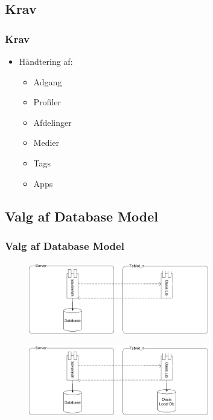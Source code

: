 \documentclass{beamer}
\begin{document}
\subsection{Krav}

\begin{frame}
	\frametitle{Krav}
	
	\begin{itemize}
		\item H\aa{}ndtering af:
		\begin{itemize}
			\item Adgang
			\item Profiler
			\item Afdelinger
			\item Medier
			\item Tags
			\item Apps
		\end{itemize}
	\end{itemize}
\end{frame}

\subsection{Valg af Database Model}

\begin{frame}
	\frametitle{Valg af Database Model}
	\begin{figure}[!h]
		\centering
			\includegraphics[width=0.7\textwidth]{kunekstern}
		\label{fig:DatabaseModel1}
	\end{figure}
	\begin{figure}[!h]
		\centering
			\includegraphics[width=0.7\textwidth]{localogekstern}
		\label{fig:DatabaseModel2}
	\end{figure}
\end{frame}
\end{document}
